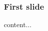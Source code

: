 \documentclass{beamer}
\begin{document}
\begin{frame}
  \frametitle{First slide}
\end{frame}

\appendix

\begin{frame}
content...
\end{frame}
\end{document}
